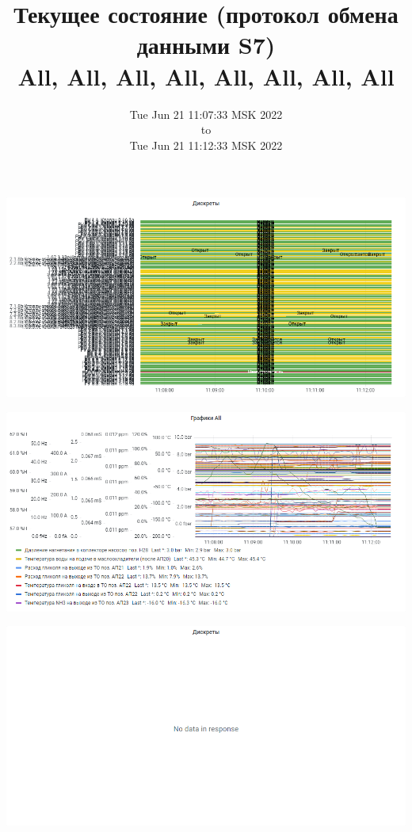 \documentclass{article}
\begin{document}
\title{Текущее состояние (протокол обмена данными S7)  \\ \large All, All, All, All, All, All, All, All  }
\date{Tue Jun 21 11:07:33 MSK 2022\\to\\Tue Jun 21 11:12:33 MSK 2022}
\maketitle
\begin{center}
\par
\vspace{0.5cm}
\includegraphics[width=\textwidth]{image15}
\par
\vspace{0.5cm}
\par
\vspace{0.5cm}
\includegraphics[width=\textwidth]{image12}
\par
\vspace{0.5cm}
\par
\vspace{0.5cm}
\includegraphics[width=\textwidth]{image154}

\end{center}
\end{document}
